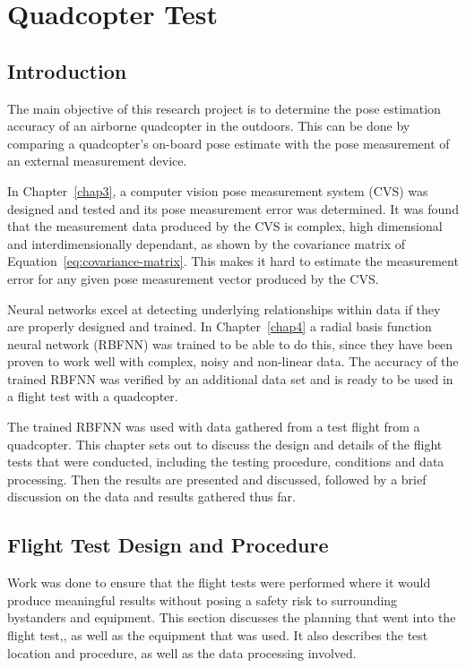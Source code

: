 \chapter{Quadcopter Test}
\label{chap5}

\section{Introduction}

The main objective of this research project is to determine the pose estimation accuracy of an airborne quadcopter in the outdoors. This can be done by comparing a quadcopter's on-board pose estimate with the pose measurement of an external measurement device.  

In Chapter~\ref{chap3}, a computer vision pose measurement system (CVS) was designed and tested and its pose measurement error was determined. It was found that the measurement data produced by the CVS is complex, high dimensional and interdimensionally dependant, as shown by the covariance matrix of Equation~\ref{eq:covariance-matrix}. This makes it hard to estimate the measurement error for any given pose measurement vector produced by the CVS.\@ 

Neural networks excel at detecting underlying relationships within data if they are properly designed and trained. In Chapter~\ref{chap4} a radial basis function neural network (RBFNN) was trained to be able to do this, since they have been proven to work well with complex, noisy and non-linear data. The accuracy of the trained RBFNN was verified by an additional data set and is ready to be used in a flight test with a quadcopter. 

The trained RBFNN was used with data gathered from a test flight from a quadcopter. This chapter sets out to discuss the design and details of the flight tests that were conducted, including the testing procedure, conditions and data processing. Then the results are presented and discussed, followed by a brief discussion on the data and results gathered thus far. 

\section{Flight Test Design and Procedure}

Work was done to ensure that the flight tests were performed where it would produce meaningful results without posing a safety risk to surrounding bystanders and equipment. This section discusses the planning that went into the flight test,, as well as the equipment that was used. It also describes the test location and procedure, as well as the data processing involved.  

